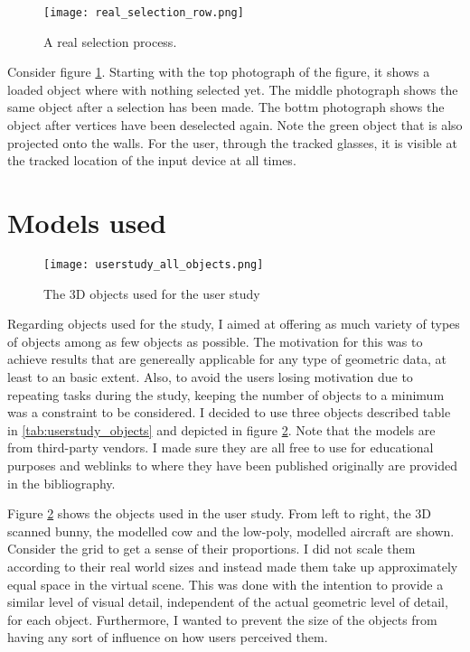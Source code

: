 \begin{figure}[htb]
  \centering
  \texttt{[image: real\_selection\_row.png]}\\ %
  \caption{A real selection process. }\label{fig:real_selection}
\end{figure}

Consider figure \ref{fig:real_selection}. Starting with the top photograph of the figure, it shows a loaded object where with nothing selected yet. The middle photograph shows the same object after a selection has been made. The bottm photograph shows the object after vertices have been deselected again. Note the green object that is also projected onto the walls. For the user, through the tracked glasses, it is visible at the tracked location of the input device at all times.

	\section{Models used}
	\label{sec:models_used}
%
%

\begin{figure}[htb]
  \centering
  \texttt{[image: userstudy\_all\_objects.png]}\\ %
  \caption{The 3D objects used for the user study}\label{fig:all_objects}
\end{figure}

Regarding objects used for the study, I aimed at offering as much variety of types of objects among as few objects as possible. The motivation for this was to achieve results that are genereally applicable for any type of geometric data, at least to an basic extent. Also, to avoid the users losing motivation due to repeating tasks during the study, keeping the number of objects to a minimum was a constraint to be considered. I decided to use three objects described table in \ref{tab:userstudy_objects} and depicted in figure \ref{fig:all_objects}. Note that the models are from third-party vendors. I made sure they are all free to use for educational purposes and weblinks to where they have been published originally are provided in the bibliography.

Figure \ref{fig:all_objects} shows the objects used in the user study. From left to right, the 3D scanned bunny, the modelled cow and the low-poly, modelled aircraft are shown. Consider the grid to get a sense of their proportions. I did not scale them according to their real world sizes and instead made them take up approximately equal space in the virtual scene. This was done with the intention to provide a similar level of visual detail, independent of the actual geometric level of detail, for each object. Furthermore, I wanted to prevent the size of the objects from having any sort of influence on how users perceived them.


